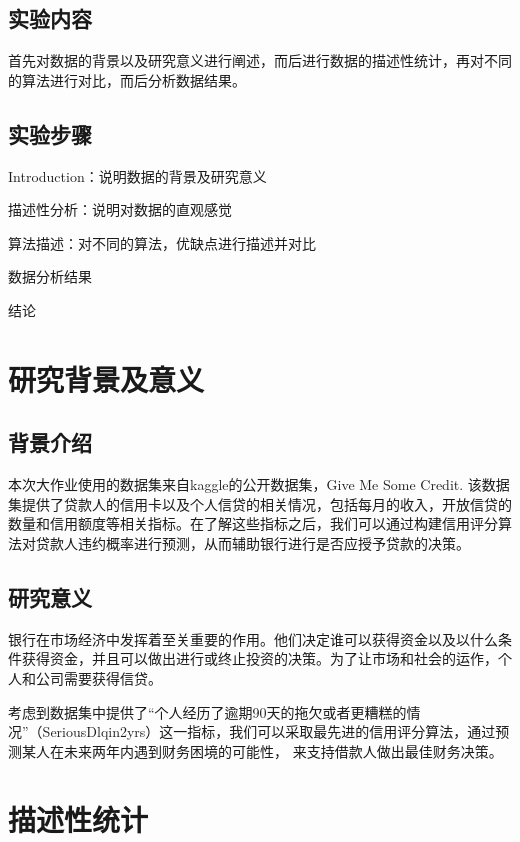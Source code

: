 \documentclass{zjureport}
\begin{document}
  \subsection{实验内容}

    首先对数据的背景以及研究意义进行阐述，而后进行数据的描述性统计，再对不同的算法进行对比，而后分析数据结果。

  \subsection{实验步骤}
    \begin{clause}
      \item Introduction：说明数据的背景及研究意义
      \item 描述性分析：说明对数据的直观感觉
      \item 算法描述：对不同的算法，优缺点进行描述并对比
      \item 数据分析结果
      \item 结论
    \end{clause}

\section{研究背景及意义}
\subsection{背景介绍}
本次大作业使用的数据集来自kaggle的公开数据集，Give Me Some Credit. 该数据集提供了贷款人的信用卡以及个人信贷的相关情况，包括每月的收入，开放信贷的数量和信用额度等相关指标。在了解这些指标之后，我们可以通过构建信用评分算法对贷款人违约概率进行预测，从而辅助银行进行是否应授予贷款的决策。 
\subsection{研究意义}
银行在市场经济中发挥着至关重要的作用。他们决定谁可以获得资金以及以什么条件获得资金，并且可以做出进行或终止投资的决策。为了让市场和社会的运作，个人和公司需要获得信贷。

考虑到数据集中提供了“个人经历了逾期90天的拖欠或者更糟糕的情况”（SeriousDlqin2yrs）这一指标，我们可以采取最先进的信用评分算法，通过预测某人在未来两年内遇到财务困境的可能性，
来支持借款人做出最佳财务决策。

\section{描述性统计}
\end{document}
